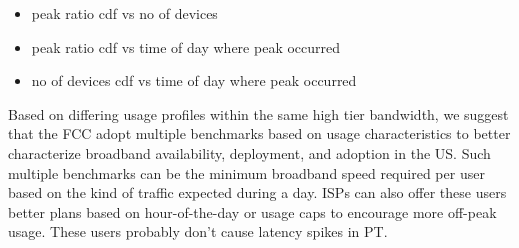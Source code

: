 \begin{itemize}
\itemsep0em
\item peak ratio cdf vs no of devices
\item peak ratio cdf vs time of day where peak occurred
\item no of devices cdf vs time of day where peak occurred
\end{itemize}

Based on differing usage profiles within the same high tier bandwidth, we suggest that the FCC adopt multiple benchmarks based on usage characteristics to better characterize broadband availability, deployment, and adoption in the US. Such multiple benchmarks can be the minimum broadband speed required per user based on the kind of traffic expected during a day. ISPs can also offer these users better plans based on hour-of-the-day or usage caps to encourage more off-peak usage. These users probably don't cause latency spikes in PT.